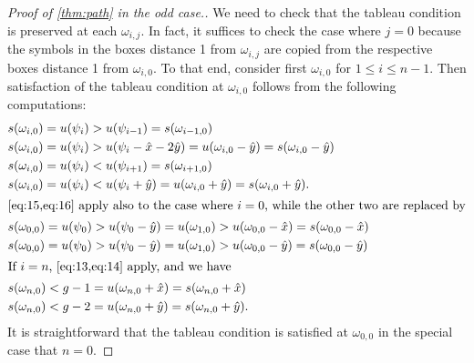 \documentclass[11pt,reqno]{amsart}
\theoremstyle{definition}
\theoremstyle{problem}
\theoremstyle{plain}
\theoremstyle{remark}
\theoremstyle{theorem}
\numberwithin{equation}{section}
\numberwithin{figure}{section}
\begin{document}
\begin{proof}[Proof of \cref{thm:path} in the odd case.]
  We need to check that the tableau condition is preserved at each
  $\omega_{i,j}$.  In fact, it suffices to check the case where
  $j = 0$ because the symbols in the boxes distance 1 from
  $\omega_{i,j}$ are copied from the respective boxes distance 1 from
  $\omega_{i,0}$.  To that end, consider first $\omega_{i,0}$ for
  $1 \leq i \leq n-1$.  Then satisfaction of the tableau condition at
  $\omega_{i,0}$ follows from the following computations:
  \begin{align}
    \label{eq:13} &s(\omega_{i,0}) = u(\psi_i) > u(\psi_{i-1}) =
                    s(\omega_{i-1,0}) \\
    \label{eq:14} &s(\omega_{i,0}) = u(\psi_i) > u(\psi_i - \hat x
                    -2\hat y) = u(\omega_{i,0} - \hat y)
                    = s(\omega_{i,0} - \hat y) \\
    \label{eq:15} &s(\omega_{i,0}) = u(\psi_i) < u(\psi_{i+1}) =
                    s(\omega_{i+1,0}) \\
    \label{eq:16} &s(\omega_{i,0}) = u(\psi_i) < u(\psi_i + \hat y)
                    = u(\omega_{i,0} + \hat y)
                    = s(\omega_{i,0} + \hat y).\\
    \intertext{\cref{eq:15,eq:16} apply also to the case where
    $i = 0$, while the other two are replaced by}
    \label{eq:17} &s(\omega_{0,0}) = u(\psi_0) > u(\psi_0 - \hat y)
                    = u(\omega_{1,0}) > u(\omega_{0,0} - \hat x)
                    = s(\omega_{0,0} - \hat x)\\
    \label{eq:18} &s(\omega_{0,0}) = u(\psi_0) > u(\psi_0 - \hat y)
                    = u(\omega_{1,0}) > u(\omega_{0,0} - \hat y)
                    = s(\omega_{0,0} - \hat y) \\
    \intertext{If $i = n$, \cref{eq:13,eq:14} apply, and we have}
    \label{eq:19} &s(\omega_{n,0}) < g-1 = u(\omega_{n,0} + \hat x)
                    = s(\omega_{n,0} + \hat x) \\
    \label{eq:20} &s(\omega_{n,0}) < g-2 = u(\omega_{n,0} + \hat y)
                    = s(\omega_{n,0} + \hat y).
  \end{align}
  It is straightforward that the tableau condition is satisfied at
  $\omega_{0,0}$ in the special case that $n = 0$.
\end{proof}
\end{document}
